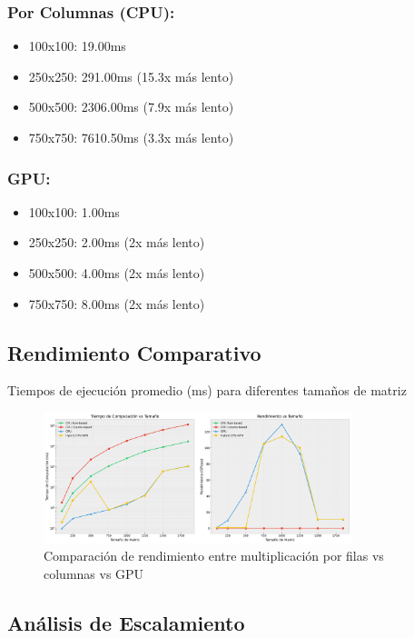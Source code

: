 \documentclass[11pt]{article}
\begin{document}
\subsubsection{Por Columnas (CPU):}
\begin{itemize}
    \item 100x100: 19.00ms
    \item 250x250: 291.00ms (15.3x más lento)
    \item 500x500: 2306.00ms (7.9x más lento)
    \item 750x750: 7610.50ms (3.3x más lento)
\end{itemize}

\subsubsection{GPU:}
\begin{itemize}
    \item 100x100: 1.00ms
    \item 250x250: 2.00ms (2x más lento)
    \item 500x500: 4.00ms (2x más lento)
    \item 750x750: 8.00ms (2x más lento)
\end{itemize}

\subsection{Rendimiento Comparativo}
\begin{table}[h]
    \centering
    \caption{Tiempos de ejecución promedio (ms) para diferentes tamaños de matriz}
\end{table}

\begin{figure}[h]
    \centering
    \includegraphics[width=0.8\textwidth]{./grafica.png}
    \caption{Comparación de rendimiento entre multiplicación por filas vs columnas vs GPU}
\end{figure}

\subsection{Análisis de Escalamiento}
\end{document}
